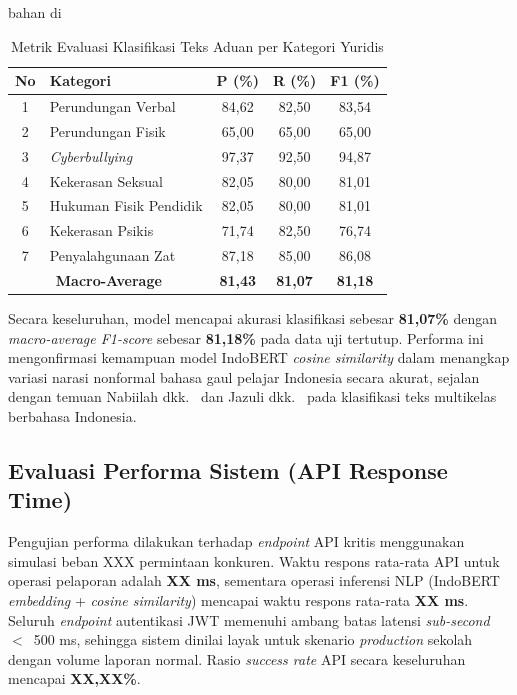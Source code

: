 bahan di\documentclass[conference]{IEEEtran}
\begin{document}
\begin{table}[htbp]
\caption{Metrik Evaluasi Klasifikasi Teks Aduan per Kategori Yuridis}
\label{tab:nlpeval}
\begin{center}
\begin{tabular}{|c|p{2.4cm}|c|c|c|}
\hline
\textbf{No} & \textbf{Kategori} & \textbf{P (\%)} & \textbf{R (\%)} & \textbf{F1 (\%)} \\
\hline
1 & Perundungan Verbal    & 84,62 & 82,50 & 83,54 \\
\hline
2 & Perundungan Fisik     & 65,00 & 65,00 & 65,00 \\
\hline
3 & \textit{Cyberbullying}& 97,37 & 92,50 & 94,87 \\
\hline
4 & Kekerasan Seksual     & 82,05 & 80,00 & 81,01 \\
\hline
5 & Hukuman Fisik Pendidik& 82,05 & 80,00 & 81,01 \\
\hline
6 & Kekerasan Psikis      & 71,74 & 82,50 & 76,74 \\
\hline
7 & Penyalahgunaan Zat    & 87,18 & 85,00 & 86,08 \\
\hline
\multicolumn{2}{|c|}{\textbf{Macro-Average}} & \textbf{81,43} & \textbf{81,07} & \textbf{81,18} \\
\hline
\end{tabular}
\end{center}
\end{table}

Secara keseluruhan, model mencapai akurasi klasifikasi sebesar \textbf{81,07\%} dengan \textit{macro-average F1-score} sebesar \textbf{81,18\%} pada data uji tertutup. Performa ini mengonfirmasi kemampuan model IndoBERT \textit{cosine similarity} dalam menangkap variasi narasi nonformal bahasa gaul pelajar Indonesia secara akurat, sejalan dengan temuan Nabiilah dkk.~\cite{nabiilah2024} dan Jazuli dkk.~\cite{jazuli2025} pada klasifikasi teks multikelas berbahasa Indonesia.

\subsection{Evaluasi Performa Sistem (API Response Time)}

Pengujian performa dilakukan terhadap \textit{endpoint} API kritis menggunakan simulasi beban XXX permintaan konkuren. Waktu respons rata-rata API untuk operasi pelaporan adalah \textbf{XX ms}, sementara operasi inferensi NLP (IndoBERT \textit{embedding} + \textit{cosine similarity}) mencapai waktu respons rata-rata \textbf{XX ms}. Seluruh \textit{endpoint} autentikasi JWT memenuhi ambang batas latensi \textit{sub-second} $<$~500 ms, sehingga sistem dinilai layak untuk skenario \textit{production} sekolah dengan volume laporan normal. Rasio \textit{success rate} API secara keseluruhan mencapai \textbf{XX,XX\%}.
\end{document}
